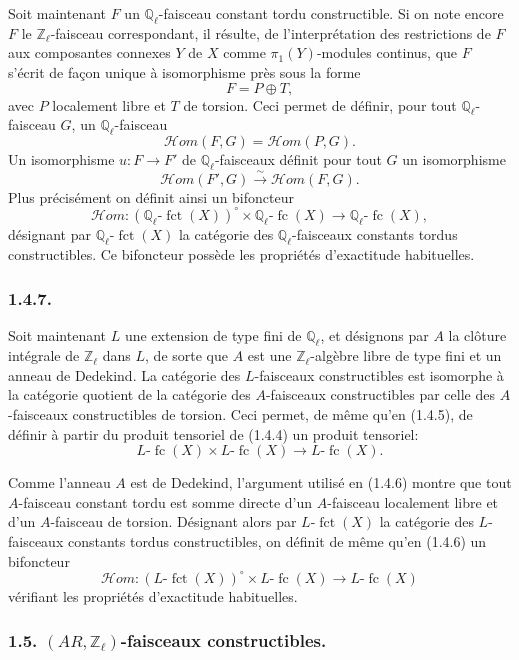 \documentclass[11pt]{article}
\providecommand{\fct}{\operatorname{fct}}
\providecommand{\cHom}{\mathcal{H}om}
\providecommand{\fc}{\operatorname{fc}}
\begin{document}
Soit maintenant \(F\) un \(\mathbb Q_\ell\)-faisceau constant tordu constructible. Si on note encore \(F\) le \(\mathbb Z_\ell\)-faisceau correspondant, il résulte, de l'interprétation des restrictions de \(F\) aux composantes connexes \(Y\) de \(X\) comme \(\pi_1(Y)\)-modules continus, que \(F\) s'écrit de façon unique à isomorphisme près sous la forme
\[
F=P\oplus T,
\]
avec \(P\) localement libre et \(T\) de torsion. Ceci permet de définir, pour tout \(\mathbb Q_\ell\)-faisceau \(G\), un \(\mathbb Q_\ell\)-faisceau
\[
\cHom(F,G)=\cHom(P,G).
\]
Un isomorphisme \(u:F\to F'\) de \(\mathbb Q_\ell\)-faisceaux définit pour tout \(G\) un isomorphisme
\[
\cHom(F',G)\xrightarrow{\sim}\cHom(F,G).
\]
Plus précisément on définit ainsi un bifoncteur
\[
\cHom:(\mathbb Q_\ell\text{-}\fct(X))^\circ\times \mathbb Q_\ell\text{-}\fc(X)
\longrightarrow \mathbb Q_\ell\text{-}\fc(X),
\]
désignant par \(\mathbb Q_\ell\text{-}\fct(X)\) la catégorie des \(\mathbb Q_\ell\)-faisceaux constants tordus constructibles. Ce bifoncteur possède les propriétés d'exactitude habituelles.

\subsubsection*{1.4.7.}
Soit maintenant \(L\) une extension de type fini de \(\mathbb Q_\ell\), et désignons par \(A\) la clôture intégrale de \(\mathbb Z_\ell\) dans \(L\), de sorte que \(A\) est une \(\mathbb Z_\ell\)-algèbre libre de type fini et un anneau de Dedekind. La catégorie des \(L\)-faisceaux constructibles est isomorphe à la catégorie quotient de la catégorie des \(A\)-faisceaux constructibles par celle des \(A\)-faisceaux constructibles de torsion. Ceci permet, de même qu'en (1.4.5), de définir à partir du produit tensoriel de (1.4.4) un produit tensoriel:
\[
L\text{-}\fc(X)\times L\text{-}\fc(X)\longrightarrow L\text{-}\fc(X).
\]

Comme l'anneau \(A\) est de Dedekind, l'argument utilisé en (1.4.6) montre que tout \(A\)-faisceau constant tordu est somme directe d'un \(A\)-faisceau localement libre et d'un \(A\)-faisceau de torsion. Désignant alors par \(L\text{-}\fct(X)\) la catégorie des \(L\)-faisceaux constants tordus constructibles, on définit de même qu'en (1.4.6) un bifoncteur
\[
\cHom:(L\text{-}\fct(X))^\circ\times L\text{-}\fc(X)
\longrightarrow L\text{-}\fc(X)
\]
vérifiant les propriétés d'exactitude habituelles.

\subsubsection*{1.5. \((AR,\mathbb Z_\ell)\)-faisceaux constructibles.}
\end{document}
